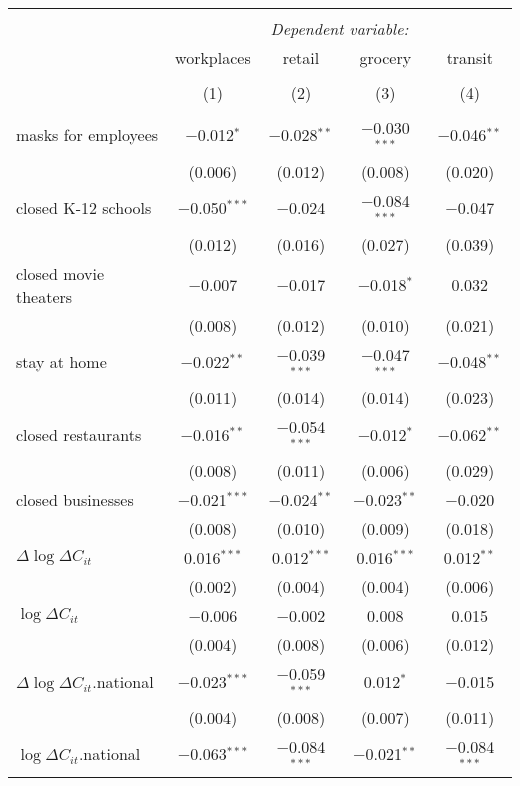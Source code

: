 \begin{tabular}{@{\extracolsep{1pt}}lcccc} 
\\[-1.8ex]\hline 
\hline \\[-1.8ex] 
 & \multicolumn{4}{c}{\textit{Dependent variable:}} \\ 
\cline{2-5} 
 & workplaces & retail & grocery & transit \\ 
\\[-1.8ex] & (1) & (2) & (3) & (4)\\ 
\hline \\[-1.8ex] 
 masks for employees & $-$0.012$^{*}$ & $-$0.028$^{**}$ & $-$0.030$^{***}$ & $-$0.046$^{**}$ \\ 
  & (0.006) & (0.012) & (0.008) & (0.020) \\ 
  closed K-12 schools & $-$0.050$^{***}$ & $-$0.024 & $-$0.084$^{***}$ & $-$0.047 \\ 
  & (0.012) & (0.016) & (0.027) & (0.039) \\ 
  closed movie theaters & $-$0.007 & $-$0.017 & $-$0.018$^{*}$ & 0.032 \\ 
  & (0.008) & (0.012) & (0.010) & (0.021) \\ 
  stay at home & $-$0.022$^{**}$ & $-$0.039$^{***}$ & $-$0.047$^{***}$ & $-$0.048$^{**}$ \\ 
  & (0.011) & (0.014) & (0.014) & (0.023) \\ 
  closed restaurants & $-$0.016$^{**}$ & $-$0.054$^{***}$ & $-$0.012$^{*}$ & $-$0.062$^{**}$ \\ 
  & (0.008) & (0.011) & (0.006) & (0.029) \\ 
  closed businesses & $-$0.021$^{***}$ & $-$0.024$^{**}$ & $-$0.023$^{**}$ & $-$0.020 \\ 
  & (0.008) & (0.010) & (0.009) & (0.018) \\ 
  $\Delta \log \Delta C_{it}$ & 0.016$^{***}$ & 0.012$^{***}$ & 0.016$^{***}$ & 0.012$^{**}$ \\ 
  & (0.002) & (0.004) & (0.004) & (0.006) \\ 
  $\log \Delta C_{it}$ & $-$0.006 & $-$0.002 & 0.008 & 0.015 \\ 
  & (0.004) & (0.008) & (0.006) & (0.012) \\ 
  $\Delta \log \Delta C_{it}$.national & $-$0.023$^{***}$ & $-$0.059$^{***}$ & 0.012$^{*}$ & $-$0.015 \\ 
  & (0.004) & (0.008) & (0.007) & (0.011) \\ 
  $\log \Delta C_{it}$.national & $-$0.063$^{***}$ & $-$0.084$^{***}$ & $-$0.021$^{**}$ & $-$0.084$^{***}$ \\ 

\end{tabular}
